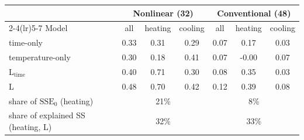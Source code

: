 \begin{tabular}{lcccccc}
\toprule
 & \multicolumn{3}{c}{Nonlinear (32)} & \multicolumn{3}{c}{Conventional (48)}\\
\cmidrule(lr){2-4}\cmidrule(lr){5-7}
Model & all & heating & cooling & all & heating & cooling\\
\midrule
time-only & 0.33 & 0.31 & 0.29 & 0.07 & 0.17 & 0.03\\
temperature-only & 0.30 & 0.18 & 0.41 & 0.07 & -0.00 & 0.07\\
L$_{\mathrm{time}}$ & 0.40 & 0.71 & 0.30 & 0.08 & 0.35 & 0.03\\
L & 0.48 & 0.70 & 0.42 & 0.12 & 0.39 & 0.08\\
\midrule
share of $\mathrm{SSE}_0$ (heating) & \multicolumn{3}{c}{21\%} & \multicolumn{3}{c}{8\%}\\
share of explained SS (heating, L) & \multicolumn{3}{c}{32\%} & \multicolumn{3}{c}{33\%}\\
\bottomrule
\end{tabular}
